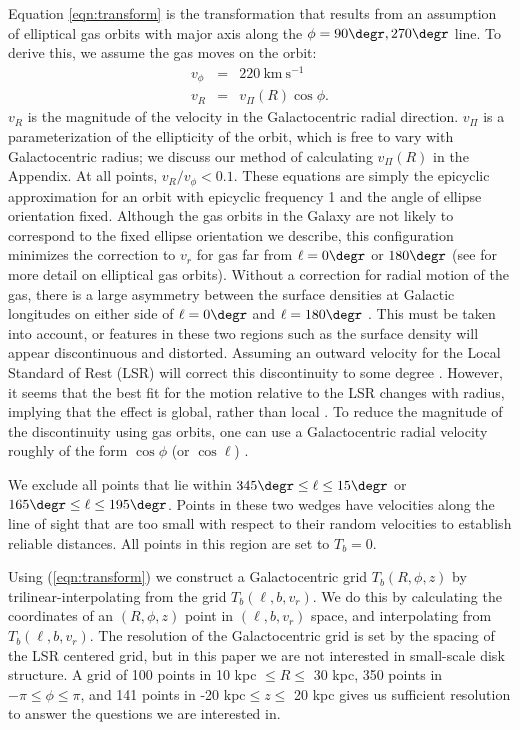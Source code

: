 \documentclass[apj]{emulateapj}
\begin{document}
 Equation \ref{eqn:transform} is the transformation that results from an assumption of elliptical gas orbits with major axis
 along the $\phi=90\degr, 270\degr$ line. To derive this, we assume the gas moves on the orbit:
 \begin{eqnarray}\label{eqn:ellipse}
 v_\phi&=&220~\mathrm{km~s^{-1}}\nonumber\\
 v_R&=&v_\Pi(R)\cos\phi.
 \end{eqnarray}
$v_R$ is the magnitude of the velocity in the Galactocentric radial direction. $v_\Pi$ is a parameterization of the ellipticity of the orbit, which is free to vary with Galactocentric radius; we discuss our method of calculating $v_\Pi(R)$ in the Appendix. At all points, $v_R/v_\phi<0.1$. These equations are  simply the epicyclic approximation for an orbit with epicyclic frequency 1 and  the angle of ellipse orientation fixed.  Although the gas orbits in the Galaxy are not likely to correspond to the fixed ellipse orientation we describe, this configuration minimizes the correction to $v_r$ for gas far from $\ell=0\degr$ or $180\degr$ (see  \citet{V1999} for more detail on elliptical gas orbits). 
Without a correction for radial motion of the gas,  there is a large asymmetry between the surface densities at Galactic longitudes on either side of $\ell =0\degr$ and $\ell =180\degr$ \citep{HJK1982}. This must be taken into account, or features in these two regions such as the surface density will appear discontinuous  and distorted. Assuming an outward velocity for the Local Standard of Rest (LSR) will correct this discontinuity to some degree \citep{K1962,KW1965}. However, it seems that the best fit for the motion relative to the LSR  changes with radius, implying that the effect is global, rather than local \citep{BS1991}. To reduce the magnitude of the discontinuity using gas orbits, one can use a Galactocentric radial velocity roughly of the form $\cos\phi$ (or $\cos\ell$) \citep{KT1994}. 

We  exclude  all points that lie within $345\degr\le\ell\le15\degr$ or $165\degr\le\ell\le195\degr$. Points in these two wedges have velocities along the line of sight that are too small with respect to their random velocities to establish reliable distances. All points in this region are set to $T_b = 0$.

Using (\ref{eqn:transform}) we construct a Galactocentric grid $T_b(R,\phi,z)$  by trilinear-interpolating from the grid $T_b(\ell,b,v_r)$.  We do this by calculating the coordinates of an $(R,\phi,z)$ point in $(\ell,b,v_r)$ space, and interpolating from $T_b(\ell,b,v_r)$. The resolution of the Galactocentric grid is set by the spacing of the LSR centered grid, but in this paper we are not interested in  small-scale disk structure. A grid of 100 points in 10 kpc $\le R \le$ 30 kpc, 350 points in $-\pi\le\phi\le \pi$, and 141 points in -20 kpc$\le z \le$ 20 kpc gives us sufficient resolution to answer the questions we are interested in.
\end{document}
